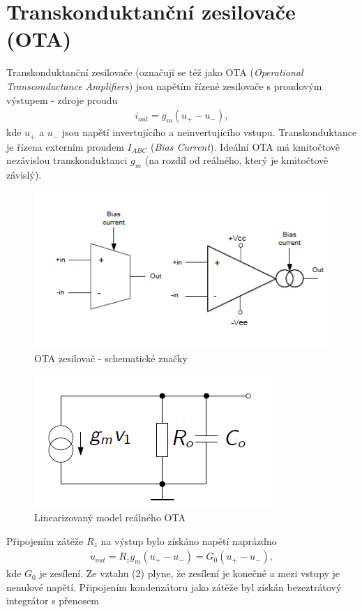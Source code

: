 \documentclass[twoside]{article}
\begin{document}
\section{Transkonduktanční zesilovače (OTA)}
Transkonduktanční zesilovače (označují se též jako OTA (\textit{Operational Transconductance Amplifiers}) jsou napětím řízené zesilovače s proudovým výstupem - zdroje proudu
\begin{align}
i_{out} = g_m(u_+ - u_-),
\end{align}
kde $u_+$ a $u_-$ jsou napětí invertujícího a neinvertujícího vstupu.  Transkonduktance je řízena externím proudem $I_{ABC}$ (\textit{Bias Current}). Ideální OTA má kmitočtově nezávislou transkonduktanci $g_m$ (na rozdíl od reálného, který je kmitočtově závislý).
\begin{figure}[H]
\centering
\includegraphics[scale=0.75]{image7.png}
\caption{OTA zesilovač - schematické značky \cite{3}}
\end{figure}
\begin{figure}[H]
\centering
\includegraphics[scale=0.65]{gmrc.png}
\caption{Linearizovaný model reálného OTA \cite{4}}
\end{figure}
\noindent Připojením zátěže $R_z$ na výstup bylo získáno napětí naprázdno
\begin{align}
u_{out} = R_zg_m(u_+ - u_-) = G_0(u_+ - u_-),
\end{align}
kde $G_0$ je zesílení. Ze vztahu (2) plyne, že zesílení je konečné a mezi vstupy je nenulové napětí. Připojením kondenzátoru jako zátěže byl získán bezeztrátový integrátor s přenosem
\end{document}
